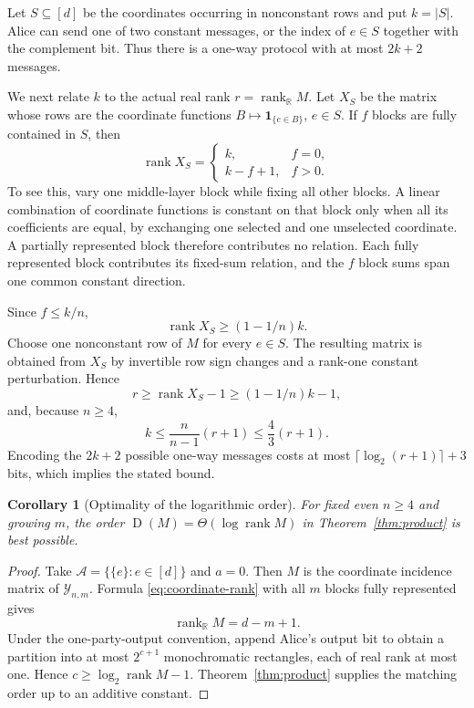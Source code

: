 \documentclass[11pt]{article}
\newtheorem{corollary}[theorem]{Corollary}
\theoremstyle{definition}
\theoremstyle{remark}
\newcommand{\cA}{\mathcal A}
\newcommand{\cY}{\mathcal Y}
\newcommand{\R}{\mathbb R}
\newcommand{\1}{\mathbf 1}
\newcommand{\rank}{\operatorname{rank}}
\newcommand{\Dcc}{\operatorname{D}}
\begin{document}
Let $S\subseteq[d]$ be the coordinates occurring in nonconstant rows and
put $k=|S|$.  Alice can send one of two constant messages, or the index of
$e\in S$ together with the complement bit.  Thus there is a one-way protocol
with at most $2k+2$ messages.

We next relate $k$ to the actual real rank $r=\rank_{\R}M$.  Let $X_S$ be
the matrix whose rows are the coordinate functions
$B\mapsto\1_{\{e\in B\}}$, $e\in S$.  If $f$ blocks are fully contained in
$S$, then
\begin{equation}\label{eq:coordinate-rank}
 \rank X_S=
 \begin{cases}
 k,&f=0,\\
 k-f+1,&f>0.
 \end{cases}
\end{equation}
To see this, vary one middle-layer block while fixing all other blocks.  A
linear combination of coordinate functions is constant on that block only
when all its coefficients are equal, by exchanging one selected and one
unselected coordinate.  A partially represented block therefore contributes
no relation.  Each fully represented block contributes its fixed-sum
relation, and the $f$ block sums span one common constant direction.

Since $f\le k/n$,
\begin{equation}\label{eq:k-rankx}
 \rank X_S\ge(1-1/n)k.
\end{equation}
Choose one nonconstant row of $M$ for every $e\in S$.  The resulting matrix
is obtained from $X_S$ by invertible row sign changes and a rank-one constant
perturbation.  Hence
\[
 r\ge\rank X_S-1\ge(1-1/n)k-1,
\]
and, because $n\ge4$,
\begin{equation}\label{eq:k-rank}
 k\le\frac n{n-1}(r+1)\le\frac43(r+1).
\end{equation}
Encoding the $2k+2$ possible one-way messages costs at most
$\lceil\log_2(r+1)\rceil+3$ bits, which implies the stated bound.

\begin{corollary}[Optimality of the logarithmic order]
\label{cor:optimal}
For fixed even $n\ge4$ and growing $m$, the order
$\Dcc(M)=\Theta(\log\rank M)$ in Theorem~\ref{thm:product} is best possible.
\end{corollary}

\begin{proof}
Take $\cA=\{\{e\}:e\in[d]\}$ and $a=0$.  Then $M$ is the coordinate
incidence matrix of $\cY_{n,m}$.  Formula \eqref{eq:coordinate-rank} with
all $m$ blocks fully represented gives
\[
 \rank_{\R}M=d-m+1.
\]
Under the one-party-output convention, append Alice's output bit to obtain
a partition into at most $2^{c+1}$ monochromatic rectangles, each of real
rank at most one.  Hence $c\ge\log_2\rank M-1$.
Theorem~\ref{thm:product} supplies the matching order up to an additive
constant.
\end{proof}
\end{document}

